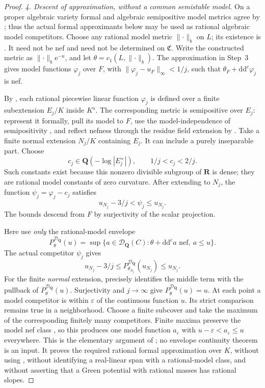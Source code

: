 \begin{proof}
\emph{4. Descent of approximation, without a common semistable model.}
On a proper algebraic variety formal and algebraic semipositive model
metrics agree by \cite[Theorem~1.1]{GM19}; thus the actual formal
approximants below may be used as rational algebraic model competitors.
Choose any rational model metric \(\lVert\cdot\rVert_b\) on \(L\);
its existence is \cite[\S2.1 and Proposition~2.10]{GM19}.
It need not be nef and need not be determined on \(\mathfrak C\).
Write the constructed metric as
\(\lVert\cdot\rVert_b\mathrm e^{-u}\), and let
\(\theta=c_1(L,\lVert\cdot\rVert_b)\).
The approximation in Step~3 gives model functions \(\varphi_j\)
over \(F\), with
\(\lVert\varphi_j-u_F\rVert_\infty<1/j\), such that
\(\theta_F+\mathrm d\mathrm d^c\varphi_j\) is nef.

By \cite[Proposition~2.18(b)]{GM19}, each rational piecewise linear
function \(\varphi_j\) is defined over a finite subextension
\(E_j/K\) inside \(K^{\mathrm a}\).  The corresponding metric
is semipositive over \(E_j\): represent it formally, pull its model
to \(F\), use the model-independence of semipositivity
\cite[Proposition~3.5]{GM19}, and reflect nefness through the residue
field extension by \cite[Lemma~3.3]{GM19}.  Take a finite normal
extension \(N_j/K\) containing \(E_j\).  It can include a purely
inseparable part.  Choose
\[
 c_j\in\mathbf Q(-\log|E_j^\times|),\qquad 1/j<c_j<2/j.
\]
Such constants exist because this nonzero divisible subgroup of
\(\mathbf R\) is dense; they are rational model constants of zero
curvature.  After extending to \(N_j\), the function
\(\psi_j=\varphi_j-c_j\) satisfies
\[
       u_{N_j}-3/j<\psi_j\leq u_{N_j}.
\]
The bounds descend from \(F\) by surjectivity of the scalar projection.

Here use \emph{only} the rational-model envelope
\[
 P^{\mathcal D_{\mathbf Q}}_\theta(u)
 =\sup\{a\in\mathcal D_{\mathbf Q}(C):
                 \theta+\mathrm d\mathrm d^ca\text{ nef},\ a\leq u\}.
\]
The actual competitor \(\psi_j\) gives
\[
 u_{N_j}-3/j
 \leq P^{\mathcal D_{\mathbf Q}}_{\theta_{N_j}}(u_{N_j})
 \leq u_{N_j}.
\]
For the finite \emph{normal} extension, precisely
\cite[Proposition~2.11]{GJKM19} identifies the middle term with the
pullback of \(P^{\mathcal D_{\mathbf Q}}_\theta(u)\).  Surjectivity
and \(j\to\infty\) give
\(P^{\mathcal D_{\mathbf Q}}_\theta(u)=u\).
At each point a model competitor is within \(\varepsilon\) of the
continuous function \(u\).  Its strict comparison remains true in
a neighborhood.  Choose a finite subcover and take the maximum of
the corresponding finitely many competitors.  Finite maxima preserve
the model nef class \cite[\S2.5]{GJKM19}, so this produces one model
function \(a_\varepsilon\) with
\(u-\varepsilon<a_\varepsilon\leq u\) everywhere.
This is the elementary argument of
\cite[Proposition~2.9(8)]{GJKM19}; no envelope continuity theorem is
an input.  It proves the required rational formal approximation over
\(K\), without using \cite[Theorem~3.1 or Proposition~3.10]{GJKM19}, without
identifying a real-linear span with a rational-model class, and without
asserting that a Green potential with rational masses has rational slopes.


\end{proof}
